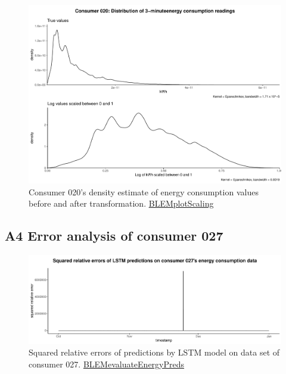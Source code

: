 \begin{centering}
\begin{figure}[!htbp]
        \includegraphics[width=\textwidth-0.85cm]{thesis/graphs/c020_density.pdf}
        \caption[Exemplary energy consumption distribution before and after transformation]{Consumer 020's density estimate of energy consumption values before and after transformation. \quantnet\href{https://github.com/QuantLet/BLEM/tree/master/BLEMplotScaling}{BLEMplotScaling}}
\end{figure}
\end{centering}


\subsection*{\hypertarget{AppA4:Figures:erroranalysis}{A4} Error analysis of consumer 027}\label{AppA4:Figures:erroranalysis}

\begin{centering}
\begin{figure}[H]
    \includegraphics[width=\textwidth]{thesis/graphs/evaluation/c027_squarederrors.pdf}
    \caption[Squared relative errors of predictions by LSTM model on consumer 027]{Squared relative errors of predictions by LSTM model on data set of consumer 027. \quantnet\href{https://github.com/QuantLet/BLEM/tree/master/BLEMevaluateEnergyPreds}{BLEMevaluateEnergyPreds}}
\end{figure}
\end{centering}


